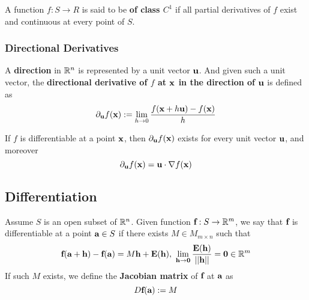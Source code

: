 \documentclass[11pt]{article}
\newcommand{\vex}[0]{\ve{x}}
\newcommand{\vea}[0]{\ve{a}}
\newcommand{\vef}[0]{\ve{f}}
\begin{document}
				\begin{definition}
					A function $f: S \to R$ is said to be \textbf{of class $C^1$} if all partial derivatives of $f$ exist and continuous at every point of $S$.
				\end{definition}
								
			\subsubsection{Directional Derivatives}
				\begin{definition}
					A \textbf{direction} in $\mathbb{R}^n$ is represented by a unit vector $\textbf{u}$. And given such a unit vector, the \textbf{directional derivative of $f$ at $\vex$ in the direction of $\textbf{u}$} is defined as
					\begin{equation}
						\partial_{\ve{u}} f(\vex) := \lim_{h \to 0} \frac{f(\vex + h \ve{u}) - f(\vex)}{h}
					\end{equation}
				\end{definition}
				
				\begin{theorem}
					If $f$ is differentiable at a point $\vex$, then $\partial_{\ve{u}} f(\vex)$ exists for every unit vector $\textbf{u}$, and moreover
					\begin{equation}
						\partial_{\ve{u}} f(\vex) = \ve{u} \cdot \nabla f(\vex)
					\end{equation}
				\end{theorem}
		
		\subsection{Differentiation}
			\begin{definition}
				Assume $S$ is an open subset of $\mathbb{R}^n$. Given function $\vef: S \to \R^m$, we say that $\textbf{f}$ is differentiable at a point $\vea \in S$ if there exists $M \in M_{m \times n}$ such that
				\begin{equation}
					\vef(\vea + \ve{h}) - \vef(\vea) = M \ve{h} + \ve{E}(\ve{h}),\ \lim_{\ve{h} \to \ve{0}} \frac{\ve{E}(\ve{h})}{\norm{\ve{h}}} = \ve{0} \in \R^m
				\end{equation}
				If such $M$ exists, we define the \textbf{Jacobian matrix} of $\vef$ at $\vea$ as 
				\begin{equation}
					D\vef(\vea) := M
				\end{equation}
			\end{definition}
			
\end{document}
